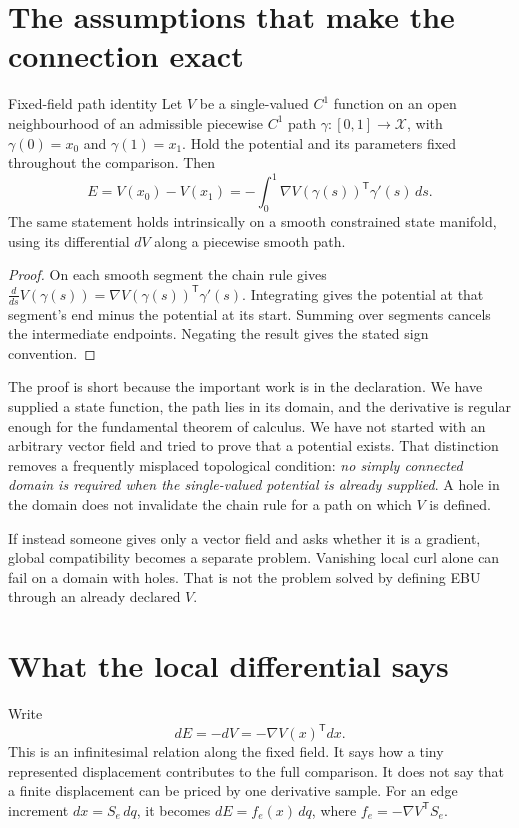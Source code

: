 \section{The assumptions that make the connection exact}
\begin{theorem}{Fixed-field path identity}\label{thm:path}
Let $V$ be a single-valued $C^1$ function on an open neighbourhood of an admissible piecewise $C^1$ path $\gamma:[0,1]\to\mathcal X$, with $\gamma(0)=x_0$ and $\gamma(1)=x_1$. Hold the potential and its parameters fixed throughout the comparison. Then
\begin{equation}\label{eq:path-main}
 E=V(x_0)-V(x_1)
   =-\int_0^1\nabla V(\gamma(s))^{\mathsf T}\gamma'(s)\,ds.
\end{equation}
The same statement holds intrinsically on a smooth constrained state manifold, using its differential $dV$ along a piecewise smooth path.
\end{theorem}
\begin{proof}
On each smooth segment the chain rule gives
$\frac{d}{ds}V(\gamma(s))=\nabla V(\gamma(s))^{\mathsf T}\gamma'(s)$.
Integrating gives the potential at that segment's end minus the potential at its start. Summing over segments cancels the intermediate endpoints. Negating the result gives the stated sign convention.
\end{proof}

The proof is short because the important work is in the declaration. We have supplied a state function, the path lies in its domain, and the derivative is regular enough for the fundamental theorem of calculus. We have not started with an arbitrary vector field and tried to prove that a potential exists. That distinction removes a frequently misplaced topological condition: \emph{no simply connected domain is required when the single-valued potential is already supplied}. A hole in the domain does not invalidate the chain rule for a path on which $V$ is defined.

If instead someone gives only a vector field and asks whether it is a gradient, global compatibility becomes a separate problem. Vanishing local curl alone can fail on a domain with holes. That is not the problem solved by defining EBU through an already declared $V$.

\section{What the local differential says}
Write
\begin{equation}
 dE=-dV=-\nabla V(x)^{\mathsf T}dx.
\end{equation}
This is an infinitesimal relation along the fixed field. It says how a tiny represented displacement contributes to the full comparison. It does not say that a finite displacement can be priced by one derivative sample. For an edge increment $dx=S_e\,dq$, it becomes $dE=f_e(x)\,dq$, where $f_e=-\nabla V^{\mathsf T}S_e$.

